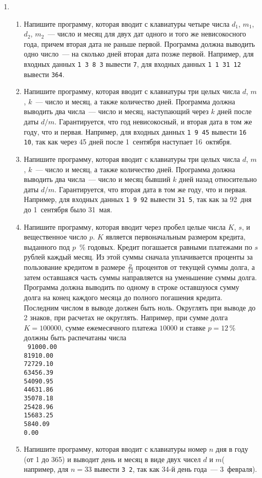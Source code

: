 \documentclass{article}
\begin{document}
\begin{enumerate}[label={}, leftmargin=0pt, itemindent=0pt]
\item

\begin{enumerate}[label=\arabic{enumi}.\arabic*.]
\item
Напишите программу, которая вводит с клавиатуры четыре числа $d_1$, $m_1$, $d_2$, $m_2$~--- число и месяц для двух дат одного и того же невисокосного года, причем вторая дата не раньше первой. Программа должна выводить одно число~--- на сколько дней вторая дата позже первой. Например, для входных данных \texttt{1 3 8 3} вывести \texttt{7}, для входных данных \texttt{1 1 31 12} вывести \texttt{364}.
\item
Напишите программу, которая вводит с клавиатуры три целых числа $d$, $m$, $k$~--- число и месяц, а также количество дней. Программа должна выводить два числа~--- число и месяц, наступающий через $k$ дней после даты $d/m$. Гарантируется, что год невисокосный, и вторая дата в том же году, что и первая. Например, для входных данных \texttt{1 9 45} вывести \texttt{16 10}, так как через 45 дней после 1~сентября наступает 16~октября.
\item
Напишите программу, которая вводит с клавиатуры три целых числа $d$, $m$, $k$~--- число и месяц, а также количество дней. Программа должна выводить два числа~--- число и месяц бывший $k$ дней назад относительно даты $d/m$. Гарантируется, что вторая дата в том же году, что и первая. Например, для входных данных \texttt{1 9 92} вывести \texttt{31 5}, так как за 92~дня до 1~сентября было 31~мая.
\item
Напишите программу, которая вводит через пробел целые числа $K$, $s$, и вещественное число $p$. $K$ является первоначальным размером кредита, выданного под $p$~\% годовых. Кредит погашается равными платежами по $s$ рублей каждый месяц. Из этой суммы сначала уплачивается проценты за пользование кредитом в размере $\frac{p}{12}$ процентов от текущей суммы долга, а затем оставшаяся часть суммы  направляется на уменьшение суммы долга. Программа должна выводить по одному в строке оставшуюся сумму долга на конец каждого месяца до полного погашения кредита. Последним числом в выводе должен быть ноль. Округлять при выводе до 2 знаков, при расчетах не округлять.
Например, при сумме долга $K=100000$, сумме ежемесячного платежа $10000$ и ставке $p=12$\,\%  должны быть распечатаны числа \\
\texttt{
91000.00\\
81910.00\\
72729.10\\
63456.39\\
54090.95\\
44631.86\\
35078.18\\
25428.96\\
15683.25\\
5840.09\\
0.00}
\item
Напишите программу, которая вводит с клавиатуры номер $n$ дня в году (от 1 до 365) и выводит день и месяц в виде двух чисел $d$ и $m$( например, для $n=33$ вывести \texttt{3 2}, так как 34-й день года~--- 3~февраля).


\end{enumerate}
\end{enumerate}
\end{document}
